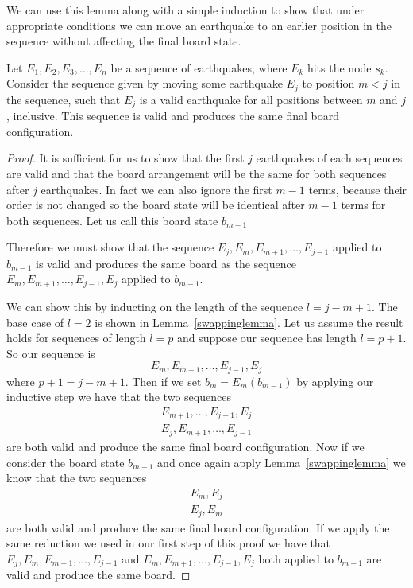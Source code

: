 \documentclass[runningheads,a4paper]{llncs}
\begin{document}
We can use this lemma along with a simple induction to show that under appropriate conditions we can move an earthquake to an earlier position in the sequence without affecting the final board state.
\begin{lemma}
Let $E_1,E_2,E_3,\dots, E_n$ be a sequence of earthquakes, where $E_k$ hits the node $s_k$. Consider  the sequence given by moving some earthquake $E_j$ to position $m<j$ in the sequence, such that $E_j$ is a valid earthquake for all positions between $m$ and $j$, inclusive. 
This sequence is valid and produces the same final board configuration.
\end{lemma}
\label{shiftlemma}
\begin{proof}
It is sufficient for us to show that the first $j$ earthquakes of each sequences are valid and that the board arrangement will be the same for both sequences after $j$ earthquakes. In fact we can also ignore the first $m-1$ terms, because their order is not changed so the board state will be identical after $m-1$ terms for both sequences. Let us call this board state $b_{m-1}$

Therefore we must show that the sequence $E_j, E_m, E_{m+1}, \ldots, E_{j-1}$ applied to $b_{m-1}$ is valid and produces the same board as the sequence $E_m, E_{m+1}, \ldots, E_{j-1}, E_j$ applied to $b_{m-1}$. 

We can show this by inducting on the length of the sequence $l=j-m+1$. The base case of $l=2$ is shown in Lemma~\ref{swappinglemma}. Let us assume the result holds for sequences of length $l=p$ and suppose our sequence has length $l=p+1$. So our sequence is 
\begin{equation*}
E_m, E_{m+1}, \ldots, E_{j-1}, E_j
\end{equation*}
where $p+1=j-m+1$. Then if we set $b_{m} = E_{m} (b_{m-1})$ by applying our inductive step we have that the two sequences 
\begin{align*}
E_{m+1}, \ldots, E_{j-1}, E_{j} \\ 
E_{j}, E_{m+1}, \ldots,  E_{j-1} 
\end{align*}
are both valid and produce the same final board configuration. Now if we consider the board state $b_{m-1}$ and once again apply Lemma~\ref{swappinglemma} we know that the two sequences 
\begin{align*}
E_{m}, E_{j} \\
E_{j}, E_{m}
\end{align*}
are both valid and produce the same final board configuration. If we apply the same reduction we used in our first step of this proof we have that $E_j, E_m, E_{m+1}, \ldots, E_{j-1}$ and $E_m, E_{m+1}, \ldots, E_{j-1}, E_j$ both applied to $b_{m-1}$ are valid and produce the same board. 
\end{proof}
\end{document}
